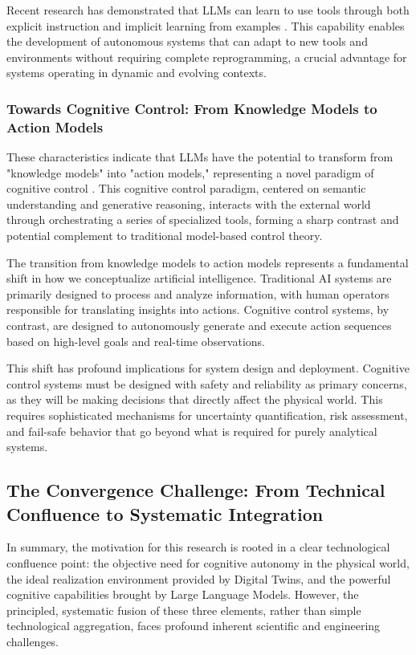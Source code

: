 Recent research has demonstrated that LLMs can learn to use tools through both explicit instruction and implicit learning from examples \cite{parisi2022talm, qin2023toolllm}. This capability enables the development of autonomous systems that can adapt to new tools and environments without requiring complete reprogramming, a crucial advantage for systems operating in dynamic and evolving contexts.

\subsubsection{Towards Cognitive Control: From Knowledge Models to Action Models}

These characteristics indicate that LLMs have the potential to transform from "knowledge models" into "action models," representing a novel paradigm of cognitive control \cite{mnih2016asynchronous, sutton2018reinforcement}. This cognitive control paradigm, centered on semantic understanding and generative reasoning, interacts with the external world through orchestrating a series of specialized tools, forming a sharp contrast and potential complement to traditional model-based control theory.

The transition from knowledge models to action models represents a fundamental shift in how we conceptualize artificial intelligence. Traditional AI systems are primarily designed to process and analyze information, with human operators responsible for translating insights into actions. Cognitive control systems, by contrast, are designed to autonomously generate and execute action sequences based on high-level goals and real-time observations.

This shift has profound implications for system design and deployment. Cognitive control systems must be designed with safety and reliability as primary concerns, as they will be making decisions that directly affect the physical world. This requires sophisticated mechanisms for uncertainty quantification, risk assessment, and fail-safe behavior that go beyond what is required for purely analytical systems.

\subsection{The Convergence Challenge: From Technical Confluence to Systematic Integration}

In summary, the motivation for this research is rooted in a clear technological confluence point: the objective need for cognitive autonomy in the physical world, the ideal realization environment provided by Digital Twins, and the powerful cognitive capabilities brought by Large Language Models. However, the principled, systematic fusion of these three elements, rather than simple technological aggregation, faces profound inherent scientific and engineering challenges.

